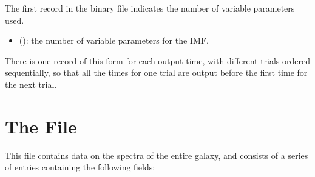 \documentclass[letterpaper,10pt,english]{sphinxmanual}
\begin{document}
The first record in the binary file indicates the number of variable parameters used.
\begin{itemize}
\item {} 
 (): the number of variable parameters for the IMF.

\end{itemize}

There is one record of this form for each output time, with different trials ordered sequentially, so that all the times for one trial are output before the first time for the next trial.


\section{The  File}
\label{\detokenize{output:the-integrated-spec-file}}\label{\detokenize{output:ssec-int-spec-file}}
This file contains data on the spectra of the entire galaxy, and consists of a series of entries containing the following fields:
\end{document}
